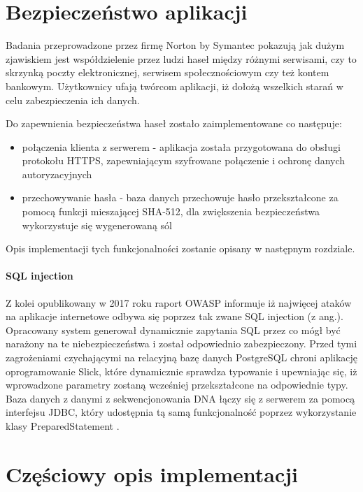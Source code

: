 \documentclass[a4paper,12pt,twoside]{article}
\begin{document}
\newpage
\section{Bezpieczeństwo aplikacji}  
Badania przeprowadzone przez firmę Norton by Symantec \cite{nortonSec}
pokazują jak dużym zjawiskiem jest współdzielenie przez ludzi haseł między różnymi serwisami, czy to
skrzynką poczty elektronicznej, serwisem społecznościowym czy też kontem bankowym.
Użytkownicy ufają twórcom aplikacji, iż dołożą wszelkich starań w celu zabezpieczenia ich 
danych. 

Do zapewnienia bezpieczeństwa haseł zostało zaimplementowane co następuje:
\begin{itemize}
\item{połączenia klienta z serwerem} - aplikacja została przygotowana do obsługi protokołu HTTPS,
zapewniającym szyfrowane połączenie i ochronę danych autoryzacyjnych
\item{przechowywanie hasła - baza danych przechowuje hasło przekształcone za pomocą funkcji mieszającej SHA-512, dla zwiększenia bezpieczeństwa wykorzystuje się wygenerowaną sól 
}
\end{itemize}
Opis implementacji tych funkcjonalności zostanie opisany w następnym rozdziale.

\paragraph{SQL injection} Z kolei opublikowany w 2017 roku raport OWASP \cite{owasp}
informuje iż najwięcej ataków na aplikacje internetowe odbywa się poprzez tak zwane SQL injection (z ang.). 
Opracowany system generował dynamicznie zapytania SQL przez co mógł być narażony na te niebezpieczeństwa i został odpowiednio zabezpieczony.
Przed tymi zagrożeniami czychającymi na relacyjną bazę danych PostgreSQL chroni aplikację oprogramowanie Slick, które dynamicznie sprawdza typowanie i upewniając się, iż wprowadzone parametry
zostaną wcześniej przekształcone na odpowiednie typy.
Baza danych z danymi z sekwencjonowania DNA łączy się z serwerem za pomocą interfejsu JDBC,
który udostępnia tą samą funkcjonalność poprzez wykorzystanie klasy PreparedStatement \cite{preparedStatement}.

\newpage

\section{Częściowy opis implementacji}
\end{document}

